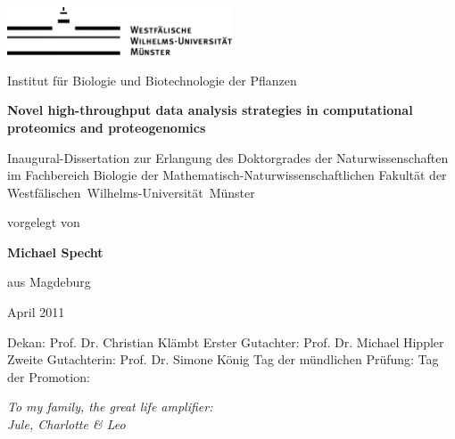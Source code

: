 \documentclass[11pt,a4paper,twoside]{report}
\makeatletter
\def\cleardoublepage{\clearpage\if@twoside \ifodd\c@page\else
    \hbox{}
    \thispagestyle{plain}
    \newpage
    \if@twocolumn\hbox{}\newpage\fi\fi\fi}
\makeatother
\begin{document}
\pagestyle{empty}


\begin{center}
\includegraphics[width=0.5\textwidth]{figures/wwu-logo-black.jpg}

{\Large Institut f\"ur Biologie und Biotechnologie der Pflanzen}

\vspace*{5cm}

{\bf \Huge Novel high-throughput data analysis strategies in computational proteomics and proteogenomics}

\vspace*{4cm}

{\Large Inaugural-Dissertation zur Erlangung des Doktorgrades der
Naturwissenschaften im Fachbereich Biologie der
Mathematisch-Naturwissenschaftlichen Fakult\"at der
\mbox{Westf\"alischen Wilhelms-Universit\"at M\"unster}}

\vspace*{2cm}

{\Large vorgelegt von}

{\LARGE \bf Michael Specht}

{\Large aus Magdeburg}

{\LARGE April 2011}

\end{center}

\cleardoublepage

\vspace*{550pt}

Dekan: Prof. Dr. Christian Kl\"ambt \newline
Erster Gutachter: Prof. Dr. Michael Hippler \newline
Zweite Gutachterin: Prof. Dr. Simone K\"onig \newline
Tag der m\"undlichen Pr\"ufung: \newline
Tag der Promotion: \newline

\cleardoublepage

\vspace*{200pt}
\begin{flushright}
{\Large\em
To my family, the great life amplifier: \\
Jule, Charlotte \& Leo
}
\end{flushright}
\end{document}

